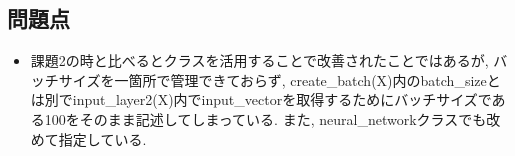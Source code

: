 \documentclass[a4j, titlepage]{jarticle}
\begin{document}
\subsection*{問題点}
    \begin{itemize}
        \item 課題2の時と比べるとクラスを活用することで改善されたことではあるが, バッチサイズを一箇所で管理できておらず, create\_batch(X)内のbatch\_sizeとは別でinput\_layer2(X)内でinput\_vectorを取得するためにバッチサイズである100をそのまま記述してしまっている. また, neural\_networkクラスでも改めて指定している. 
    \end{itemize}
\end{document}
